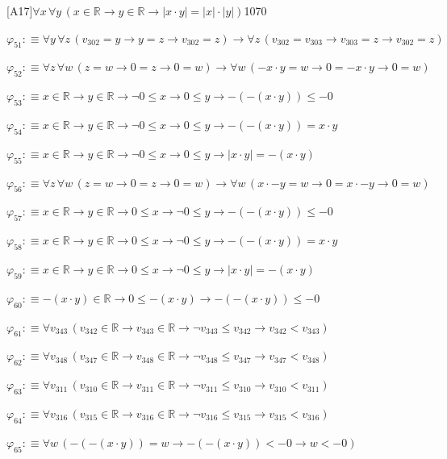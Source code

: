 \begin{fullproof}{[A17]}{$\forall x\,\forall y\,(x \in \mathbb{R} \to y \in \mathbb{R} \to \lvert x \cdot y \rvert = \lvert x \rvert \cdot \lvert y \rvert)$}{1070}
\begin{abbrevlist}
\item $\varphi_{51} :\equiv \forall y\,\forall z\,(v_{302} = y \to y = z \to v_{302} = z) \to \forall z\,(v_{302} = v_{303} \to v_{303} = z \to v_{302} = z)$
\item $\varphi_{52} :\equiv \forall z\,\forall w\,(z = w \to 0 = z \to 0 = w) \to \forall w\,(-x \cdot y = w \to 0 = -x \cdot y \to 0 = w)$
\item $\varphi_{53} :\equiv x \in \mathbb{R} \to y \in \mathbb{R} \to \neg 0 \leq x \to 0 \leq y \to -(-(x \cdot y)) \leq -0$
\item $\varphi_{54} :\equiv x \in \mathbb{R} \to y \in \mathbb{R} \to \neg 0 \leq x \to 0 \leq y \to -(-(x \cdot y)) = x \cdot y$
\item $\varphi_{55} :\equiv x \in \mathbb{R} \to y \in \mathbb{R} \to \neg 0 \leq x \to 0 \leq y \to \lvert x \cdot y \rvert = -(x \cdot y)$
\item $\varphi_{56} :\equiv \forall z\,\forall w\,(z = w \to 0 = z \to 0 = w) \to \forall w\,(x \cdot -y = w \to 0 = x \cdot -y \to 0 = w)$
\item $\varphi_{57} :\equiv x \in \mathbb{R} \to y \in \mathbb{R} \to 0 \leq x \to \neg 0 \leq y \to -(-(x \cdot y)) \leq -0$
\item $\varphi_{58} :\equiv x \in \mathbb{R} \to y \in \mathbb{R} \to 0 \leq x \to \neg 0 \leq y \to -(-(x \cdot y)) = x \cdot y$
\item $\varphi_{59} :\equiv x \in \mathbb{R} \to y \in \mathbb{R} \to 0 \leq x \to \neg 0 \leq y \to \lvert x \cdot y \rvert = -(x \cdot y)$
\item $\varphi_{60} :\equiv -(x \cdot y) \in \mathbb{R} \to 0 \leq -(x \cdot y) \to -(-(x \cdot y)) \leq -0$
\item $\varphi_{61} :\equiv \forall v_{343}\,(v_{342} \in \mathbb{R} \to v_{343} \in \mathbb{R} \to \neg v_{343} \leq v_{342} \to v_{342} < v_{343})$
\item $\varphi_{62} :\equiv \forall v_{348}\,(v_{347} \in \mathbb{R} \to v_{348} \in \mathbb{R} \to \neg v_{348} \leq v_{347} \to v_{347} < v_{348})$
\item $\varphi_{63} :\equiv \forall v_{311}\,(v_{310} \in \mathbb{R} \to v_{311} \in \mathbb{R} \to \neg v_{311} \leq v_{310} \to v_{310} < v_{311})$
\item $\varphi_{64} :\equiv \forall v_{316}\,(v_{315} \in \mathbb{R} \to v_{316} \in \mathbb{R} \to \neg v_{316} \leq v_{315} \to v_{315} < v_{316})$
\item $\varphi_{65} :\equiv \forall w\,(-(-(x \cdot y)) = w \to -(-(x \cdot y)) < -0 \to w < -0)$

\end{abbrevlist}
\end{fullproof}
